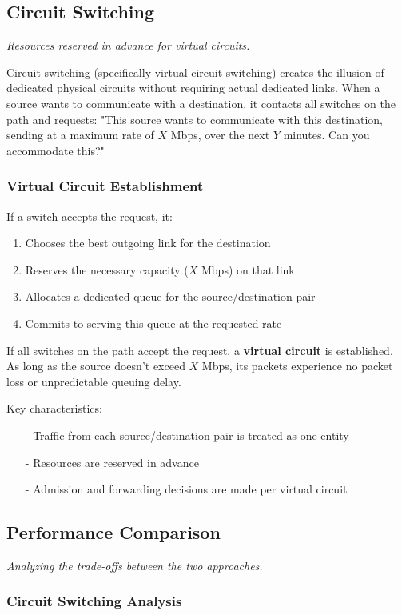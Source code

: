 \documentclass[../../compsys.tex]{subfiles}
\begin{document}
\subsection{Circuit Switching}
\textit{Resources reserved in advance for virtual circuits.}

Circuit switching (specifically virtual circuit switching) creates the illusion of dedicated physical circuits without requiring actual dedicated links. When a source wants to communicate with a destination, it contacts all switches on the path and requests: "This source wants to communicate with this destination, sending at a maximum rate of $X$ Mbps, over the next $Y$ minutes. Can you accommodate this?"

\subsubsection{Virtual Circuit Establishment}
If a switch accepts the request, it:
\begin{enumerate}
  \item Chooses the best outgoing link for the destination
  \item Reserves the necessary capacity ($X$ Mbps) on that link
  \item Allocates a dedicated queue for the source/destination pair
  \item Commits to serving this queue at the requested rate
\end{enumerate}

If all switches on the path accept the request, a \textbf{virtual circuit} is established. As long as the source doesn't exceed $X$ Mbps, its packets experience no packet loss or unpredictable queuing delay.

Key characteristics:
\begin{itemize}
  \item[-] Traffic from each source/destination pair is treated as one entity
  \item[-] Resources are reserved in advance
  \item[-] Admission and forwarding decisions are made per virtual circuit
\end{itemize}

\subsection{Performance Comparison}
\textit{Analyzing the trade-offs between the two approaches.}

\subsubsection{Circuit Switching Analysis}
\end{document}
